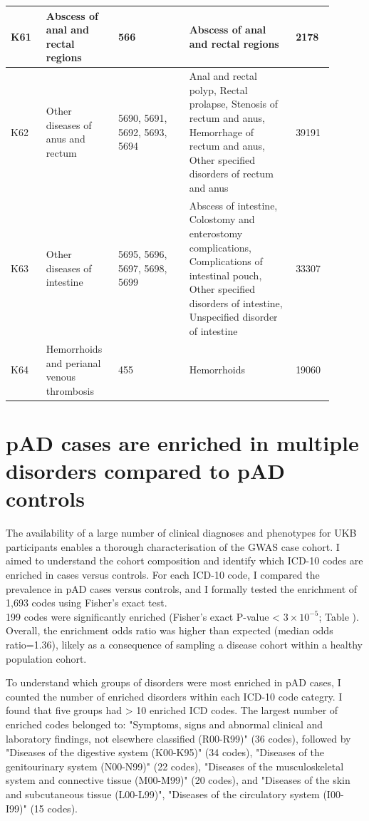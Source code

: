 \begin{table}[]
\begin{tabular}{|p{0.1\linewidth}|p{0.2\linewidth}|p{0.2\linewidth}|p{0.3\linewidth}|p{0.1\linewidth}|}
  K61         & Abscess of anal and rectal regions                        & 566                                 & Abscess of anal and rectal regions              &     2178                                                                                                                        \\ \hline
  K62         & Other diseases of anus and rectum                         & 5690, 5691, 5692, 5693, 5694            & Anal and rectal polyp, Rectal prolapse, Stenosis of rectum and anus, Hemorrhage of rectum and anus, Other specified disorders of rectum and anus            & 39191                \\ \hline
  K63         & Other diseases of intestine                               & 5695, 5696, 5697, 5698, 5699            & Abscess of intestine, Colostomy and enterostomy complications, Complications of intestinal pouch, Other specified disorders of intestine, Unspecified disorder of intestine & 33307 \\ \hline
  K64         & Hemorrhoids and perianal venous thrombosis                & 455                                 & Hemorrhoids & 19060\\ \hline

  \end{tabular}
  \end{table}
  \section{pAD cases are enriched in multiple disorders compared to pAD controls}\label{section:pheno_enrich}
  The availability of a large number of clinical diagnoses and phenotypes for UKB participants enables a thorough characterisation of the GWAS case cohort. I aimed to understand the cohort composition and identify which ICD-10 codes are enriched in cases versus controls. For each ICD-10 code, I compared the prevalence in pAD cases versus controls, and I formally tested the enrichment of 1,693 codes using Fisher's exact test. \\

  199 codes were significantly enriched (Fisher’s exact  P-value < $3\times10^{-5}$; Table ). Overall, the enrichment odds ratio was higher than expected (median odds ratio=1.36), likely as a consequence of sampling a disease cohort within a healthy population cohort. 
  
  To understand which groups of disorders were most enriched in pAD cases, I counted the number of enriched disorders within each ICD-10 code categry. I found that five groups had > 10 enriched ICD codes. The largest number of enriched codes belonged to: "Symptoms, signs and abnormal clinical and laboratory findings, not elsewhere classified (R00-R99)" (36 codes), followed by "Diseases of the digestive system (K00-K95)" (34 codes), "Diseases of the genitourinary system (N00-N99)" (22 codes), "Diseases of the musculoskeletal system and connective tissue (M00-M99)" (20 codes), and "Diseases of the skin and subcutaneous tissue (L00-L99)", "Diseases of the circulatory system (I00-I99)" (15 codes).\\
  
